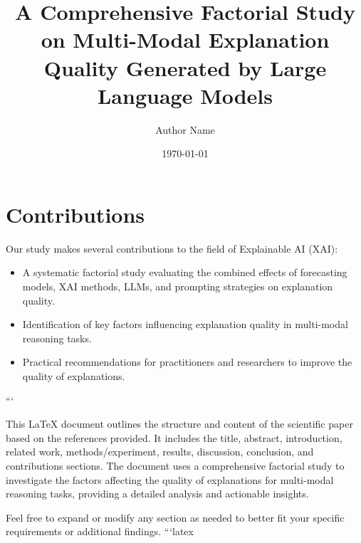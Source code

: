 \section{Contributions}
\label{sec:contributions}
Our study makes several contributions to the field of Explainable AI (XAI):
\begin{itemize}
    \item A systematic factorial study evaluating the combined effects of forecasting models, XAI methods, LLMs, and prompting strategies on explanation quality.
    \item Identification of key factors influencing explanation quality in multi-modal reasoning tasks.
    \item Practical recommendations for practitioners and researchers to improve the quality of explanations.
\end{itemize}


```

This LaTeX document outlines the structure and content of the scientific paper based on the references provided. It includes the title, abstract, introduction, related work, methods/experiment, results, discussion, conclusion, and contributions sections. The document uses a comprehensive factorial study to investigate the factors affecting the quality of explanations for multi-modal reasoning tasks, providing a detailed analysis and actionable insights. 

Feel free to expand or modify any section as needed to better fit your specific requirements or additional findings. ```latex
\documentclass{article}
\usepackage[utf8]{inputenc}
\usepackage{amsmath}
\usepackage{graphicx}
\usepackage{hyperref}

\title{A Comprehensive Factorial Study on Multi-Modal Explanation Quality Generated by Large Language Models}
\author{Author Name}
\date{\today}



\maketitle

\begin{abstract}
This paper presents a comprehensive factorial study on the generation of explanations for multi-modal reasoning tasks by Large Language Models (LLMs). We investigate the impact of forecasting models, Explainable AI (XAI) methods, LLM selections, and prompting strategies on the quality of natural language explanations. Using a standardized evaluation framework, such as G-Eval, we aim to provide a holistic understanding of the factors influencing explanation quality in complex, multi-modal scenarios. Our findings will contribute to the development of more robust and interpretable AI systems.
\end{abstract}

